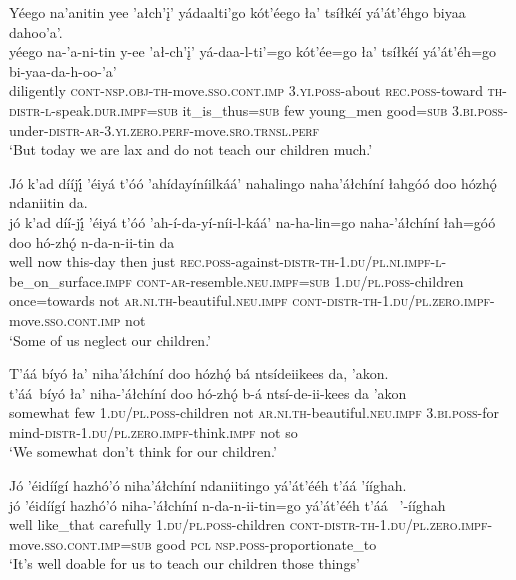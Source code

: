 \ea\label{ex:text6-16-32}
Yéego na’anitin yee ’ałch’į’ yádaalti’go kót’éego ła’ tsíłkéí yá’át’éhgo biyaa dahoo’a’.\\
\gll yéego	na-’a-ni-tin	y-ee	’ał-ch’į’	yá-daa-l-ti’=go	kót’ée=go	ła’	tsíłkéí	yá’át’éh=go	bi-yaa-da-h-oo-’a’\\
     diligently	\textsc{cont}-\textsc{nsp}.\textsc{obj}-\textsc{th}-move.\textsc{sso}.\textsc{cont}.\textsc{imp}	3.\textsc{yi}.\textsc{poss}-about	\textsc{rec}.\textsc{poss}-toward	\textsc{th}-\textsc{distr}-\textsc{l}-speak.\textsc{dur}.\textsc{impf}=\textsc{sub}	it\_is\_thus=\textsc{sub}	few	young\_men	good=\textsc{sub}	3.\textsc{bi}.\textsc{poss}-under-\textsc{distr}-\textsc{ar}-3.\textsc{yi}.\textsc{zero}.\textsc{perf}-move.\textsc{sro}.\textsc{trnsl}.\textsc{perf}\\
\glt `But today we are lax and do not teach our children much.'
\z

\ea\label{ex:text6-16-33}
Jó k’ad dííjį́ ’éiyá t’óó ’ahídayíníilkáá’ nahalingo naha’áłchíní łahgóó doo hózhǫ́ ndaniitin da.\\
\gll jó	k’ad	díí-jį́	’éiyá	t’óó	’ah-í-da-yí-níi-l-káá’	na-ha-lin=go	naha-’áłchíní	łah=góó	doo	hó-zhǫ́	n-da-n-ii-tin	da\\
     well	now	this-day	then	just	\textsc{rec}.\textsc{poss}-against-\textsc{distr}-\textsc{th}-1.\textsc{du}/\textsc{pl}.\textsc{ni}.\textsc{impf}-\textsc{l}-be\_on\_surface.\textsc{impf}	\textsc{cont}-\textsc{ar}-resemble.\textsc{neu}.\textsc{impf}=\textsc{sub}	1.\textsc{du}/\textsc{pl}.\textsc{poss}-children	once=towards	not	\textsc{ar}.\textsc{ni}.\textsc{th}-beautiful.\textsc{neu}.\textsc{impf}	\textsc{cont}-\textsc{distr}-\textsc{th}-1.\textsc{du}/\textsc{pl}.\textsc{zero}.\textsc{impf}-move.\textsc{sso}.\textsc{cont}.\textsc{imp}	not\\
\glt `Some of us neglect our children.'
\z

\ea\label{ex:text6-16-34}
T’áá bíyó ła’ niha’áłchíní doo hózhǫ́ bá ntsídeiikees da, ’akon.\\
\gll t’áá~{bíyó}	ła’	niha-’áłchíní	doo	hó-zhǫ́	b-á	ntsí-de-ii-kees	da	’akon\\
     somewhat	few	1.\textsc{du}/\textsc{pl}.\textsc{poss}-children	not	\textsc{ar}.\textsc{ni}.\textsc{th}-beautiful.\textsc{neu}.\textsc{impf}	3.\textsc{bi}.\textsc{poss}-for	mind-\textsc{distr}-1.\textsc{du}/\textsc{pl}.\textsc{zero}.\textsc{impf}-think.\textsc{impf}	not	so\\
\glt `We somewhat don’t think for our children.'
\z

\newpage
\ea\label{ex:text6-16-35}
Jó ’éidíígí hazhó’ó niha’áłchíní ndaniitingo yá’át’ééh t’áá ’ííghah.\\
\gll jó	’éidíígí	hazhó’ó	niha-’áłchíní	n-da-n-ii-tin=go	yá’át’ééh	t’áá	~{’-ííghah}\\
     well	like\_that	carefully	1.\textsc{du}/\textsc{pl}.\textsc{poss}-children	\textsc{cont}-\textsc{distr}-\textsc{th}-1.\textsc{du}/\textsc{pl}.\textsc{zero}.\textsc{impf}-move.\textsc{sso}.\textsc{cont}.\textsc{imp}=\textsc{sub}	good	\textsc{pcl}	\textsc{nsp}.\textsc{poss}-proportionate\_to\\
\glt `It’s well doable for us to teach our children those things'
\z

